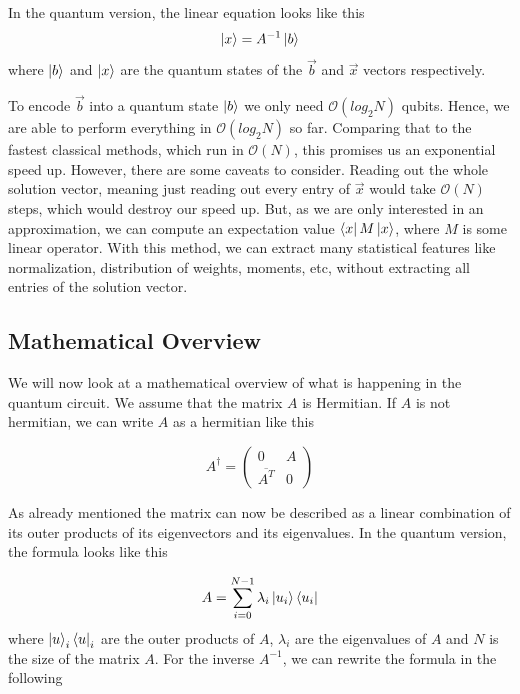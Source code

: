 In the quantum version, the linear equation looks like this
\begin{equation}
\ket{x} = A^{-1}\ket{b}
\end{equation}
where $\ket b$ and $\ket x$ are the quantum states of the $\vec b$ and $\vec x$ vectors respectively.

To encode $\vec b$ into a quantum state $\ket b$ we only need $\mathcal{O}(log_2 N)$ qubits.
Hence, we are able to perform everything in $\mathcal{O}(log_2 N)$ so far. 
Comparing that to the fastest classical methods, which run in $\mathcal{O} (N)$, this promises us an exponential speed up.
However, there are some caveats to consider. 
Reading out the whole solution vector, meaning just reading out every entry of $\vec x$ would take $\mathcal{O} (N)$ steps, which would destroy our speed up.
But, as we are only interested in an approximation, we can compute an expectation value $\bra x M \ket x$, where $M$ is some linear operator. 
With this method, we can extract many statistical features like normalization, distribution of weights, moments, etc, without extracting all entries of the solution vector.



\subsection{Mathematical Overview}
We will now look at a mathematical overview of what is happening in the quantum circuit.
We assume that the matrix $A$ is Hermitian. If $A$ is not hermitian, we can write $A$ as a hermitian like this

\begin{equation}
A^\dagger = \begin{pmatrix} 0 & A \\ \overline{A^T}& 0 \end{pmatrix}
\end{equation}

As already mentioned the matrix can now be described as a linear combination of its outer products of its eigenvectors and its eigenvalues.
In the quantum version, the formula looks like this

\begin{equation}
A = \sum_{i=0}^{N-1} \lambda_i \ket{u_i}\bra{u_i}
\end{equation}
where $\ket u_i  \bra u_i$ are the outer products of $A$, $\lambda_i$ are the eigenvalues of $A$ and $N$ is the size of the matrix $A$.
For the inverse $A^{-1}$, we can rewrite the formula in the following 

